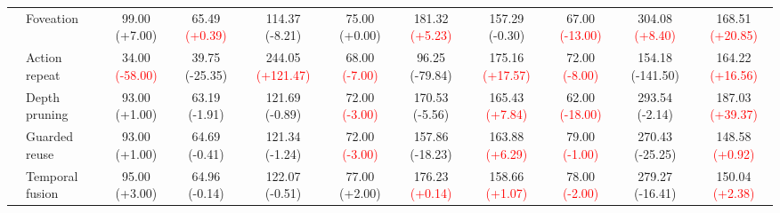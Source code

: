 \begin{table}[t]
{\begin{tabular}{clccccccccc}
& Foveation
& 99.00 {\scriptsize\textcolor{green!50!black}{(+7.00)}} & 65.49 {\scriptsize\textcolor{red}{(+0.39)}} & 114.37 {\scriptsize\textcolor{green!50!black}{(-8.21)}}
& 75.00 {\scriptsize\textcolor{green!50!black}{(+0.00)}} & 181.32 {\scriptsize\textcolor{red}{(+5.23)}} & 157.29 {\scriptsize\textcolor{green!50!black}{(-0.30)}}
& 67.00 {\scriptsize\textcolor{red}{(-13.00)}} & 304.08 {\scriptsize\textcolor{red}{(+8.40)}} & 168.51 {\scriptsize\textcolor{red}{(+20.85)}} \\

& Action repeat
& 34.00 {\scriptsize\textcolor{red}{(-58.00)}} & 39.75 {\scriptsize\textcolor{green!50!black}{(-25.35)}} & 244.05 {\scriptsize\textcolor{red}{(+121.47)}}
& 68.00 {\scriptsize\textcolor{red}{(-7.00)}} & 96.25 {\scriptsize\textcolor{green!50!black}{(-79.84)}} & 175.16 {\scriptsize\textcolor{red}{(+17.57)}}
& 72.00 {\scriptsize\textcolor{red}{(-8.00)}} & 154.18 {\scriptsize\textcolor{green!50!black}{(-141.50)}} & 164.22 {\scriptsize\textcolor{red}{(+16.56)}} \\

& Depth pruning
& 93.00 {\scriptsize\textcolor{green!50!black}{(+1.00)}} & 63.19 {\scriptsize\textcolor{green!50!black}{(-1.91)}} & 121.69 {\scriptsize\textcolor{green!50!black}{(-0.89)}}
& 72.00 {\scriptsize\textcolor{red}{(-3.00)}} & 170.53 {\scriptsize\textcolor{green!50!black}{(-5.56)}} & 165.43 {\scriptsize\textcolor{red}{(+7.84)}}
& 62.00 {\scriptsize\textcolor{red}{(-18.00)}} & 293.54 {\scriptsize\textcolor{green!50!black}{(-2.14)}} & 187.03 {\scriptsize\textcolor{red}{(+39.37)}} \\

& Guarded reuse
& 93.00 {\scriptsize\textcolor{green!50!black}{(+1.00)}} & 64.69 {\scriptsize\textcolor{green!50!black}{(-0.41)}} & 121.34 {\scriptsize\textcolor{green!50!black}{(-1.24)}}
& 72.00 {\scriptsize\textcolor{red}{(-3.00)}} & 157.86 {\scriptsize\textcolor{green!50!black}{(-18.23)}} & 163.88 {\scriptsize\textcolor{red}{(+6.29)}}
& 79.00 {\scriptsize\textcolor{red}{(-1.00)}} & 270.43 {\scriptsize\textcolor{green!50!black}{(-25.25)}} & 148.58 {\scriptsize\textcolor{red}{(+0.92)}} \\

& Temporal fusion
& 95.00 {\scriptsize\textcolor{green!50!black}{(+3.00)}} & 64.96 {\scriptsize\textcolor{green!50!black}{(-0.14)}} & 122.07 {\scriptsize\textcolor{green!50!black}{(-0.51)}}
& 77.00 {\scriptsize\textcolor{green!50!black}{(+2.00)}} & 176.23 {\scriptsize\textcolor{red}{(+0.14)}} & 158.66 {\scriptsize\textcolor{red}{(+1.07)}}
& 78.00 {\scriptsize\textcolor{red}{(-2.00)}} & 279.27 {\scriptsize\textcolor{green!50!black}{(-16.41)}} & 150.04 {\scriptsize\textcolor{red}{(+2.38)}} \\


\end{tabular}}
\end{table}
